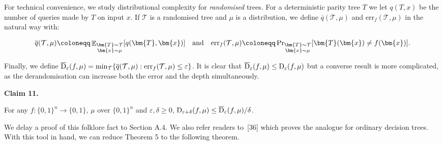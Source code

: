 \documentclass[10pt,a4paper]{article}
\begin{document}
For technical convenience, we study distributional complexity for \emph{randomised} trees. For a deterministic parity tree $T$ we let $q(T,x)$ be the number of queries made by $T$ on input $x$. If $\mathcal{T}$ is a randomised tree and $\mu$ is a distribution, we define $\overline{q}(\mathcal{T},\mu)$ and $\mathrm{err}_{f}(\mathcal{T},\mu)$ in the natural way with:\par


\[\begin{gathered}
\overline{q}(\mathcal{T},\mu)\coloneqq\mathop{\mathbb{E}}\nolimits_{\begin{subarray}{c}\bm{T}\sim\mathcal{T}\\
\bm{x}\sim\mu\end{subarray}}[q(\bm{T},\bm{x})]\quad\textup{and}\quad\mathrm{err}_{f}(\mathcal{T},\mu)\coloneqq\Pr\nolimits_{\begin{subarray}{c}\bm{T}\sim\mathcal{T}\\
\bm{x}\sim\mu\end{subarray}}[\bm{T}(\bm{x})\neq f(\bm{x})].
\end{gathered}\]


Finally, we define $\overline{{\textup{D}}}_{\varepsilon}(f,\mu)=\min_{\mathcal{T}}\{\overline{q}(\mathcal{T},\mu):\mathrm{err}_{f}(\mathcal{T},\mu)\leq\varepsilon\}$. It is clear that $\overline{{\textup{D}}}_{\varepsilon}(f,\mu)\leq{\textup{D}}_{\varepsilon}(f,\mu)$ but a converse result is more complicated, as the derandomisation can increase both the error and the depth simultaneously.\par





\par\medskip\noindent\textbf{
Claim 11. 
}\par



For any $f\colon\{0,1\}^{n}\to\{0,1\}$, $\mu$ over $\{0,1\}^{n}$ and $\varepsilon,\delta\geq 0$, ${\textup{D}}_{\varepsilon+\delta}(f,\mu)\leq\overline{{\textup{D}}}_{\varepsilon}(f,\mu)/\delta$.\par






We delay a proof of this folklore fact to Section A.4.
We also refer readers to [36] which proves the analogue for ordinary decision trees.
With this tool in hand, we can reduce Theorem 5 to the following theorem.\par
\end{document}
